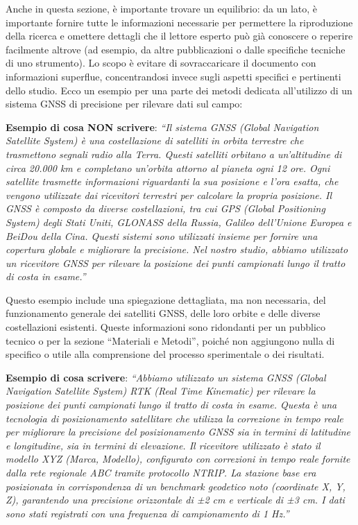 \documentclass[9pt,a4paper,twoside]{rho-class/rho}
\begin{document}
Anche in questa sezione, è importante trovare un equilibrio: da un lato, è importante fornire tutte le informazioni necessarie per permettere la riproduzione della ricerca e omettere dettagli che il lettore esperto può già conoscere o reperire facilmente altrove (ad esempio, da altre pubblicazioni o dalle specifiche tecniche di uno strumento). Lo scopo è evitare di sovraccaricare il documento con informazioni superflue, concentrandosi invece sugli aspetti specifici e pertinenti dello studio. Ecco un esempio per una parte dei metodi dedicata all'utilizzo di un sistema GNSS di precisione per rilevare dati sul campo:

\begin{info}
\textbf{Esempio di cosa NON scrivere}: 
\textit{“Il sistema GNSS (Global Navigation Satellite System) è una costellazione di satelliti in orbita terrestre che trasmettono segnali radio alla Terra. Questi satelliti orbitano a un’altitudine di circa 20.000 km e completano un’orbita attorno al pianeta ogni 12 ore. Ogni satellite trasmette informazioni riguardanti la sua posizione e l’ora esatta, che vengono utilizzate dai ricevitori terrestri per calcolare la propria posizione. Il GNSS è composto da diverse costellazioni, tra cui GPS (Global Positioning System) degli Stati Uniti, GLONASS della Russia, Galileo dell’Unione Europea e BeiDou della Cina. Questi sistemi sono utilizzati insieme per fornire una copertura globale e migliorare la precisione. Nel nostro studio, abbiamo utilizzato un ricevitore GNSS per rilevare la posizione dei punti campionati lungo il tratto di costa in esame.”}

Questo esempio include una spiegazione dettagliata, ma non necessaria, del funzionamento generale dei satelliti GNSS, delle loro orbite e delle diverse costellazioni esistenti. Queste informazioni sono ridondanti per un pubblico tecnico o per la sezione “Materiali e Metodi”, poiché non aggiungono nulla di specifico o utile alla comprensione del processo sperimentale o dei risultati.

\textbf{Esempio di cosa scrivere}: 
\textit{“Abbiamo utilizzato un sistema GNSS (Global Navigation Satellite System)  RTK (Real Time Kinematic) per rilevare la posizione dei punti campionati lungo il tratto di costa in esame. Questa è una tecnologia di posizionamento satellitare che utilizza la correzione in tempo reale per migliorare la precisione del posizionamento GNSS sia in termini di latitudine e longitudine, sia in termini di elevazione. Il ricevitore utilizzato è stato il modello XYZ (Marca, Modello), configurato con correzioni in tempo reale fornite dalla rete regionale ABC tramite protocollo NTRIP. La stazione base era posizionata in corrispondenza di un benchmark geodetico noto (coordinate X, Y, Z), garantendo una precisione orizzontale di ±2 cm e verticale di ±3 cm. I dati sono stati registrati con una frequenza di campionamento di 1 Hz.”}


\end{info}
\end{document}
